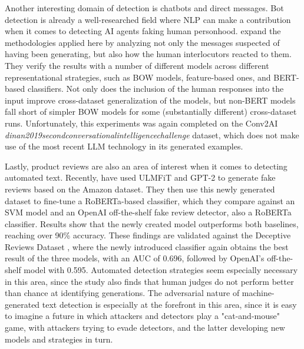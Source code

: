 Another interesting domain of detection is chatbots and direct messages.
Bot detection is already a well-researched field \citep{latah2020detection} where NLP can make a contribution when it comes to detecting AI agents faking human personhood.
\citet{bhatt2021detectingbotgeneratedtextcharacterizing} expand the methodologies applied here by analyzing not only the messages suspected of having been generating, but also how the human interlocutors reacted to them.
They verify the results with a number of different models across different representational strategies, such as BOW models, feature-based ones, and BERT-based classifiers.
Not only does the inclusion of the human responses into the input improve cross-dataset generalization of the models, but non-BERT models fall short of simpler BOW models for some (substantially different) cross-dataset runs.
Unfortunately, this experiments was again completed on the Conv2AI \emph{dinan2019secondconversationalintelligencechallenge} dataset, which does not make use of the most recent LLM technology in its generated examples.

Lastly, product reviews are also an area of interest when it comes to detecting automated text.
Recently, \citet{salminen2022creating} have used ULMFiT \citep{howard2018universal} and GPT-2 to generate fake reviews based on the Amazon \citep{ni2019justifying} dataset.
They then use this newly generated dataset to fine-tune a RoBERTa-based classifier, which they compare against an SVM model and an OpenAI off-the-shelf fake review detector, also a RoBERTa classifier.
Results show that the newly created model outperforms both baselines, reaching over 90\% accuracy.
These findings are validated against the Deceptive Reviews Dataset \citep{ott2011finding}, where the newly introduced classifier again obtains the best result of the three models, with an AUC of 0.696, followed by OpenAI's off-the-shelf model with 0.595.
Automated detection strategies seem especially necessary in this area, since the study also finds that human judges do not perform better than chance at identifying generations.
The adversarial nature of machine-generated text detection is especially at the forefront in this area, since it is easy to imagine a future in which attackers and detectors play a "cat-and-mouse" game, with attackers trying to evade detectors, and the latter developing new models and strategies in turn.
